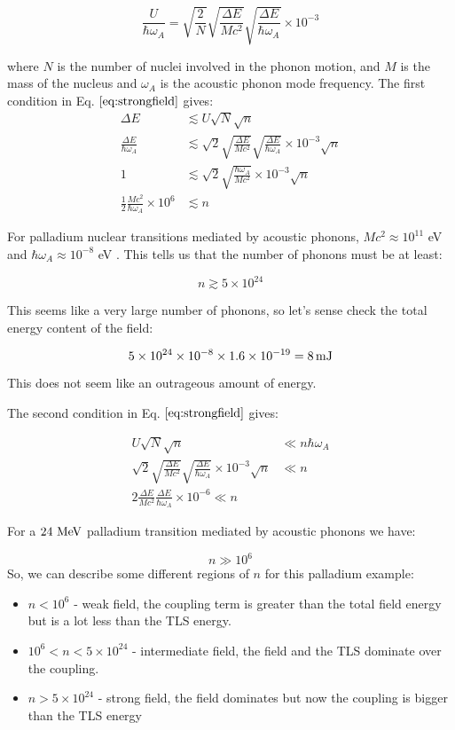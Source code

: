 \documentclass[
]{article}
\renewcommand{\[}{\begin{equation}}
\renewcommand{\]}{\end{equation}}
\providecommand{\tightlist}{%
  \setlength{\itemsep}{0pt}\setlength{\parskip}{0pt}}
\begin{document}
\[
\frac{U}{\hbar \omega_A} = \sqrt{\frac{2}{N}} \sqrt{\frac{\Delta E}{M c^2}} \sqrt{\frac{\Delta E}{\hbar \omega_A}} \times 10^{-3}
\label{eq:phononcoupling}
\]

where \(N\) is the number of nuclei involved in the phonon motion, and
\(M\) is the mass of the nucleus and \(\omega_A\) is the acoustic phonon
mode frequency. The first condition in Eq. \(\ref{eq:strongfield}\)
gives: \[
\begin{aligned}
\Delta E &\lesssim U\sqrt{N}\sqrt{n} \\
\frac{\Delta E}{\hbar \omega_A} &\lesssim \sqrt{2} \sqrt{\frac{\Delta E}{M c^2}} \sqrt{\frac{\Delta E}{\hbar \omega_A}} \times 10^{-3}\sqrt{n} \\
1 &\lesssim \sqrt{2} \sqrt{\frac{\hbar\omega_A}{M c^2}} \times 10^{-3}\sqrt{n} \\
\frac{1}{2}\frac{Mc^2}{\hbar\omega_A}\times 10^6 &\lesssim n
\end{aligned}
\]

For palladium nuclear transitions mediated by acoustic phonons,
\(M c^2 \approx 10^{11}\) eV and \(\hbar \omega_A \approx 10^{-8}\) eV .
This tells us that the number of phonons must be at least:

\[
n \gtrsim 5\times 10^{24}
\]

This seems like a very large number of phonons, so let's sense check the
total energy content of the field:

\[
5\times 10^{24} \times 10^{-8} \times 1.6\times 10^{-19} = 8 \, \rm mJ
\]

This does not seem like an outrageous amount of energy.

The second condition in Eq. \(\ref{eq:strongfield}\) gives:

\[
\begin{aligned}
U\sqrt{N}\sqrt{n} &\ll  n\hbar \omega_A \\
\sqrt{2} \sqrt{\frac{\Delta E}{M c^2}} \sqrt{\frac{\Delta E}{\hbar \omega_A}} \times 10^{-3}\sqrt{n} &\ll n \\
2\frac{\Delta E}{M c^2} \frac{\Delta E}{\hbar \omega_A} \times 10^{-6} \ll n
\end{aligned}
\]

For a \(\rm 24 \ MeV\) palladium transition mediated by acoustic phonons
we have:

\[
n \gg 10^{6}
\] So, we can describe some different regions of \(n\) for this
palladium example:

\begin{itemize}
\tightlist
\item
  \(n<10^{6}\) - weak field, the coupling term is greater than the total
  field energy but is a lot less than the TLS energy.
\item
  \(10^6 < n < 5 \times 10^{24}\) - intermediate field, the field and
  the TLS dominate over the coupling.
\item
  \(n > 5\times 10^{24}\) - strong field, the field dominates but now
  the coupling is bigger than the TLS energy
\end{itemize}
\end{document}
